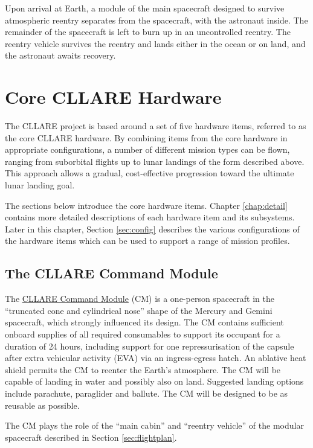 \documentclass{report}
\begin{document}
Upon arrival at Earth, a module of the main spacecraft designed to survive atmospheric reentry separates from the spacecraft, with the astronaut inside.  The remainder of the spacecraft is left to burn up in an uncontrolled reentry.  The reentry vehicle survives the reentry and lands either in the ocean or on land, and the astronaut awaits recovery.

\section{Core CLLARE Hardware}

The CLLARE project is based around a set of five hardware items, referred to as the core CLLARE hardware.  By combining items from the core hardware in appropriate configurations, a number of different mission types can be flown, ranging from suborbital flights up to lunar landings of the form described above.  This approach allows a gradual, cost-effective progression toward the ultimate lunar landing goal.

The sections below introduce the core hardware items.  Chapter \ref{chap:detail} contains more detailed descriptions of each hardware item and its subsystems.  Later in this chapter, Section \ref{sec:config} describes the various configurations of the hardware items which can be used to support a range of mission profiles.

\subsection{The CLLARE Command Module}

The \href{http://cstart.org/wiki/CLLARE_Command_Module}{CLLARE Command Module} (CM) is a one-person spacecraft in the ``truncated cone and cylindrical nose'' shape of the Mercury and Gemini spacecraft, which strongly influenced its design.  The CM contains sufficient onboard supplies of all required consumables to support its occupant for a duration of 24 hours, including support for one repressurisation of the capsule after extra vehicular activity (EVA) via an ingress-egress hatch.  An ablative heat shield permits the CM to reenter the Earth's atmosphere.  The CM will be capable of landing in water and possibly also on land.  Suggested landing options include parachute, paraglider and ballute.  The CM will be designed to be as reusable as possible.

The CM plays the role of the ``main cabin'' and ``reentry vehicle'' of the modular spacecraft described in Section \ref{sec:flightplan}.
\end{document}
